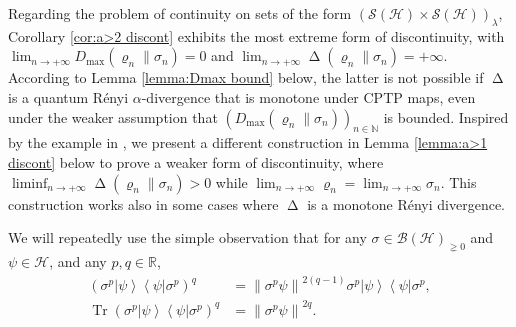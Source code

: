 \documentclass[unsortedaddress,superscriptaddress,pra,notitlepage]{revtex4}
\def\B{{\mathcal B}}
\def\S{{\mathcal S}}
\def\bN{\mathbb{N}}
\def\bR{\mathbb{R}}
\def\rho{\varrho}
\def\hil{{\mathcal H}}
\def\bz{\left(}
\def\jz{\right)}
\def\pne{_{\gneq 0}}
\newcommand{\norm}[1]{\left\| #1\right\|}
\newcommand{\diad}[2]{\left|#1\right\rangle\!\left\langle #2\right|}
\newcommand{\pr}[1]{\diad{#1}{#1}}
\DeclareMathOperator{\Tr}{Tr}
\DeclareMathOperator{\divv}{\Delta}
\begin{document}
Regarding the problem of continuity on sets of the form $(\S(\hil)\times\S(\hil))_{\lambda}$,
Corollary \ref{cor:a>2 discont}
exhibits the most extreme form of discontinuity, 
with $\lim_{n\to+\infty}D_{\max}(\rho_n\|\sigma_n)=0$ and 
$\lim_{n\to+\infty}\divv(\rho_n\|\sigma_n)=+\infty$. 
According to Lemma \ref{lemma:Dmax bound} below, the latter is not possible 
if $\divv$ is a quantum R\'enyi $\alpha$-divergence that is monotone under CPTP maps, 
even under the weaker assumption that $(D_{\max}(\rho_n\|\sigma_n))_{n\in\bN}$ is bounded. 
Inspired by the example in \cite[Figure 1]{FF2020}, 
we present a different construction in Lemma \ref{lemma:a>1 discont} below
to prove a weaker form of discontinuity, 
where $\liminf_{n\to+\infty} \divv(\rho_n\|\sigma_n)>0$ while 
$\lim_{n\to+\infty}\rho_n=\lim_{n\to+\infty}\sigma_n$.
This construction works also in some cases where $\divv$ is a 
monotone R\'enyi divergence.

We will repeatedly use the simple observation that for any 
$\sigma\in\B(\hil)\pne$ and $\psi\in\hil$, 
and any $p,q\in\bR$,
\begin{align}
\bz \sigma^p\pr{\psi}\sigma^p\jz^q&=
\norm{\sigma^p\psi}^{2(q-1)} \sigma^p\pr{\psi}\sigma^p,
\label{sandwich power1}\\
\Tr\bz \sigma^p\pr{\psi}\sigma^p\jz^q&=
\norm{\sigma^p\psi}^{2q}.\label{sandwich power2}
\end{align}
\end{document}
